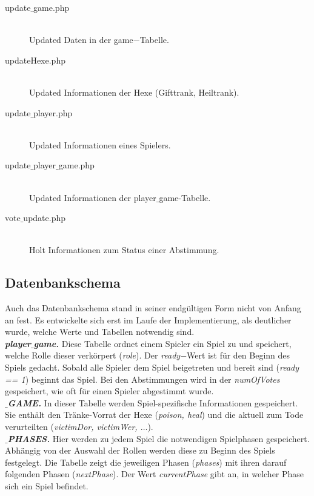 \documentclass[12pt, a4paper]{article}
\begin{document}
\begin{description}
\item[update$\_$game.php]\hfill \\
Updated Daten in der game$-$Tabelle.
	
\item[updateHexe.php]\hfill \\
Updated Informationen der Hexe (Gifttrank, Heiltrank).
	
\item[update$\_$player.php]\hfill \\
Updated Informationen eines Spielers.
	
\item[update$\_$player$\_$game.php]\hfill \\
Updated Informationen der player$\_$game-Tabelle.
	
\item[vote$\_$update.php]\hfill \\
Holt Informationen zum Status einer Abstimmung.


\end{description}
		
		
\subsection{Datenbankschema}
						
Auch das Datenbankschema stand in seiner endgültigen Form nicht von Anfang an fest. Es entwickelte sich erst im Laufe der Implementierung, als deutlicher wurde, welche Werte und Tabellen notwendig sind.		
\\	
		
\textbf{\textit{player$\_$game.}}
Diese Tabelle ordnet einem Spieler ein Spiel zu und speichert, welche Rolle dieser verkörpert (\textit{role}). Der \textit{ready}$-$Wert ist für den Beginn des Spiels gedacht. Sobald alle Spieler dem Spiel beigetreten und bereit sind (\textit{ready == 1}) beginnt das Spiel. Bei den Abstimmungen wird in der \textit{numOfVotes} gespeichert, wie oft für einen Spieler abgestimmt wurde.
\\

\textbf{\textit{$\_$GAME.}}
In dieser Tabelle werden Spiel-spezifische Informationen gespeichert. Sie enthält den Tränke-Vorrat der Hexe (\textit{poison, heal}) und die aktuell zum Tode verurteilten (\textit{victimDor, victimWer, $\dots$}).
\\

\textbf{\textit{$\_$PHASES.}}
Hier werden zu jedem Spiel die notwendigen Spielphasen gespeichert. Abhängig von der Auswahl der Rollen werden diese zu Beginn des Spiels festgelegt. Die Tabelle zeigt die jeweiligen Phasen (\textit{phases}) mit ihren darauf folgenden Phasen (\textit{nextPhase}). Der Wert \textit{currentPhase} gibt an, in welcher Phase sich ein Spiel befindet.
\\
\end{document}
